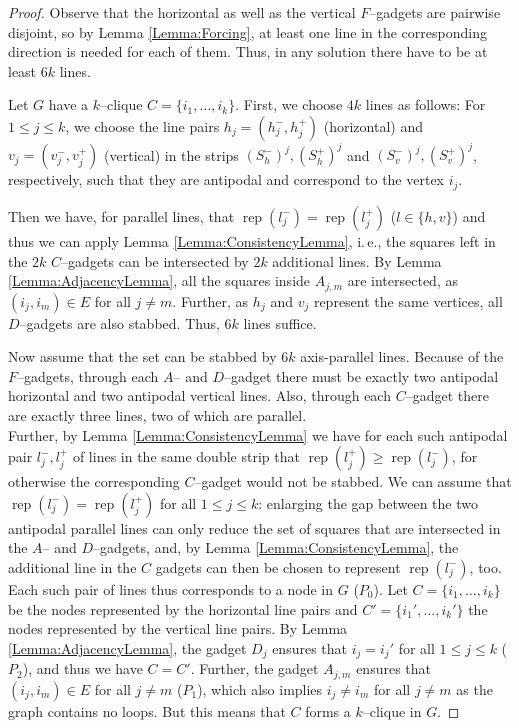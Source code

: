 \documentclass[12pt]{article}
\newcommand{\rep}{\operatorname{rep}}
\begin{document}
\begin{proof}
	Observe that the horizontal as well as the vertical $F$--gadgets are pairwise disjoint, so by Lemma \ref{Lemma:Forcing}, at least one line in the corresponding direction is needed for each of them.
  Thus, in any solution there have to be at least $6k$ lines.  

  Let $G$ have a $k$--clique $C=\{i_1, \dots, i_k\}$. First, we choose $4k$ lines as follows: For $1 \leq j \leq k$, we	choose the line pairs $h_j = (h_j^-, h_j^+)$ (horizontal) and $v_j = (v_j^-, v_j^+)$ (vertical) in the strips $(S_h^-)^j, (S_h^+)^j$ and $(S_v^-)^j, (S_v^+)^j$, respectively, such that they are antipodal and correspond to the vertex $i_j$.
  
  Then we have, for parallel lines, that
  $\rep(l_j^-) = \rep(l_j^+)$ ($l \in \{h, v\}$) and thus we can apply Lemma
  \ref{Lemma:ConsistencyLemma}, i.\,e., the squares left in the $2k$ $C$--gadgets can be
  intersected by $2k$ additional lines. By Lemma \ref{Lemma:AdjacencyLemma}, all the squares
  inside $A_{j, m}$ are intersected, as $(i_j, i_m) \in E$ for all $j
  \neq m$. Further, as $h_j$ and $v_j$ represent
  the same vertices, all $D$--gadgets are also stabbed. 
  Thus, $6k$ lines suffice.

  Now assume that the set can be stabbed by $6k$ axis-parallel lines. Because of the
  $F$--gadgets, through each $A$-- and $D$--gadget there must be exactly
  two antipodal horizontal and two antipodal vertical lines. Also, through each $C$--gadget there are exactly three lines, two of which are parallel.\\ Further, by Lemma \ref{Lemma:ConsistencyLemma} we have for each such antipodal pair $l_j^-,
  l_j^+$ of lines in the same double strip that $\rep(l_j^+) \geq \rep(l_j^-)$, 
  for otherwise the corresponding $C$--gadget would not be stabbed. We can
  assume that $\rep(l_j^-) = \rep(l_j^+)$ for all $1 \leq j \leq k$: enlarging the gap between the two antipodal parallel 
  lines can only reduce the set of squares that are intersected in the $A$-- and $D$--gadgets, and, by Lemma \ref{Lemma:ConsistencyLemma}, the additional line in the $C$ gadgets can then be chosen to represent $\rep(l_j^-)$, too. Each such pair of lines thus corresponds
  to a node in $G$ ($P_0$). Let $C=\{i_1, \dots, i_k\}$ be the nodes
  represented by the horizontal line pairs and $C'=\{i_1', \dots, i_k'\}$
  the nodes represented by the vertical line pairs. By Lemma \ref{Lemma:AdjacencyLemma}, the gadget $D_j$ ensures that $i_j = i_j'$ for all $1 \leq j \leq k$ ($P_2$), and thus we have $C = C'$. Further, the gadget $A_{j, m}$
  ensures that $(i_j, i_m) \in E$ for all $j \neq m$ ($P_1$), which also
  implies $i_j \neq i_m$ for all $j \neq m$ as the graph contains no loops. But this means that $C$ forms a $k$--clique in $G$.
  
\end{proof}
\end{document}
